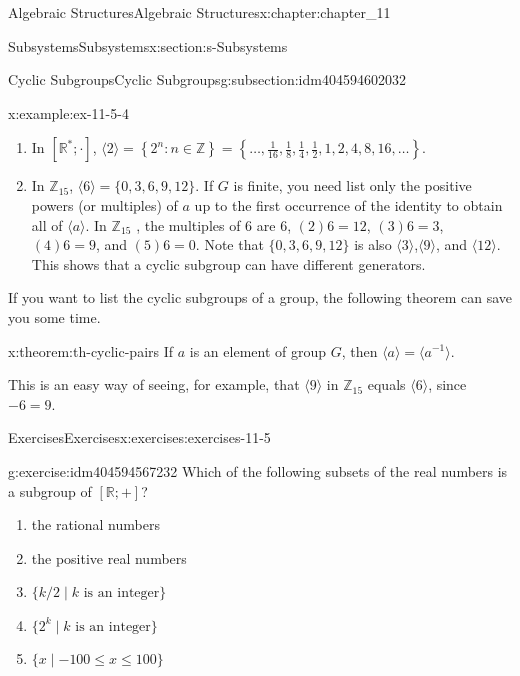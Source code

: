 \documentclass[twoside,10pt,]{book}
\numberwithin{equation}{section}
\begin{document}
\begin{chapterptx}{Algebraic Structures}{}{Algebraic Structures}{}{}{x:chapter:chapter_11}
\begin{sectionptx}{Subsystems}{}{Subsystems}{}{}{x:section:s-Subsystems}
\begin{subsectionptx}{Cyclic Subgroups}{}{Cyclic Subgroups}{}{}{g:subsection:idm404594602032}
\begin{example}{}{x:example:ex-11-5-4}
%
\begin{enumerate}[label=(\alph*)]
\item{}In \([\mathbb{R}^* ; \cdot ]\),  \(\langle 2 \rangle = \left\{2^n : n \in  \mathbb{Z}\right\} = \left\{\ldots ,\frac{1}{16}, \frac{1}{8} ,\frac{1}{4}, \frac{1}{2},
1, 2, 4, 8, 16,\ldots \right\}\).%
\item{}In \(\mathbb{Z}_{15}\), \(\langle 6 \rangle = \{0, 3, 6, 9, 12\}\).   If \(G\) is finite, you need list only the positive powers (or multiples) of \(a\) up to the first occurrence of the identity to obtain all of \(\langle a \rangle\). In \(\mathbb{Z}_{15}\) , the multiples of 6 are 6, \((2)6 = 12\), \((3)6=3\), \((4)6=9\), and \((5)6 = 0\). Note that \(\{0, 3, 6, 9, 12\}\) is also \(\langle 3 \rangle\),\(\langle 9 \rangle\), and \(\langle 12 \rangle\). This shows that a cyclic subgroup can have different generators.%
\end{enumerate}
%
\end{example}
If you want to list the cyclic subgroups of a group, the following theorem can save you some time.%
\begin{theorem}{}{}{x:theorem:th-cyclic-pairs}%
If \(a\) is an element of group \(G\), then \(\langle a \rangle = \langle a^{-1}\rangle\).%
\end{theorem}
This is an easy way of seeing, for example, that \(\langle 9 \rangle\) in \(\mathbb{Z}_{15}\) equals \(\langle 6 \rangle\), since \(-6 = 9\).%
\end{subsectionptx}
%
%
\typeout{************************************************}
\typeout{************************************************}
%
\begin{exercises-subsection}{Exercises}{}{Exercises}{}{}{x:exercises:exercises-11-5}
\begin{divisionexercise}{1}{}{}{g:exercise:idm404594567232}%
Which of the following subsets of the real numbers is a subgroup of \([\mathbb{R}; +]\)?%
\begin{enumerate}[label=(\alph*)]
\item{}the rational numbers%
\item{}the positive real numbers%
\item{}\(\{k/2 \mid k \textrm{ is} \textrm{ an} \textrm{ integer}\}\)%
\item{}\(\{2^k  \mid k \textrm{ is an  integer}\}\)%
\item{}\(\{x \mid -100 \leq x \leq  100\}\)%
\end{enumerate}
%
\end{divisionexercise}%

\end{exercises-subsection}
\end{sectionptx}
\end{chapterptx}
\end{document}
